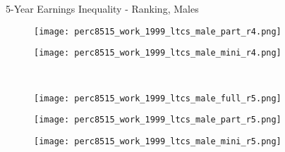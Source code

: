 \documentclass[hyperref={bookmarks=false}]{beamer}
\begin{document}
\begin{appendix}
\begin{frame}{5-Year Earnings Inequality - Ranking, Males}
\begin{figure}[!t]
\begin{minipage}[b]{0.15\textwidth}{}
\centering
\texttt{[image: perc8515\_work\_1999\_ltcs\_male\_part\_r4.png]}
\end{minipage}
\begin{minipage}[b]{0.15\textwidth}{}
\centering
\texttt{[image: perc8515\_work\_1999\_ltcs\_male\_mini\_r4.png]}
\end{minipage}\\
\begin{minipage}[b]{0.15\textwidth}{}
\centering
\texttt{[image: perc8515\_work\_1999\_ltcs\_male\_full\_r5.png]}
\end{minipage}
\begin{minipage}[b]{0.15\textwidth}{}
\centering
\texttt{[image: perc8515\_work\_1999\_ltcs\_male\_part\_r5.png]}
\end{minipage}
\begin{minipage}[b]{0.15\textwidth}{}
\centering
\texttt{[image: perc8515\_work\_1999\_ltcs\_male\_mini\_r5.png]}
\end{minipage}\\
\end{figure}
\end{frame}


\end{appendix}
\end{document}
